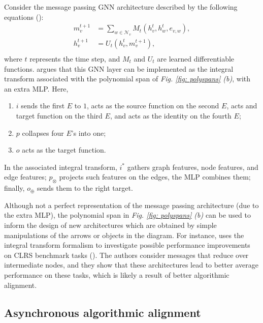 \documentclass[11pt,a4paper,openright,twoside]{report}
\theoremstyle{plain}
\theoremstyle{definition}
\begin{document}
Consider the message passing GNN architecture described by the following equations (\cite{pmlr-v70-gilmer17a}):
\begin{align*}
  m_v^{t+1} &= \sum_{w \in \mathcal{N}_v}M_t(h_v^t,h_w^t,e_{v,w}),\\
  h_v^{t+1} &= U_t(h_v^t,m_v^{t+1}),\\
\end{align*}
where $t$ represents the time step, and $M_t$ and $U_t$ are learned differentiable functions.\cite{dudzik2022graph} argues that this GNN layer can be implemented as the integral transform associated with the polynomial span of \textit{Fig. \ref{fig: polyspans} (b)}, with an extra MLP. Here,
\begin{enumerate}
  \item $i$ sends the first $E$ to $1$,  acts as the source function on the second $E$, acts  and target function on the third $E$, and acts as the identity on the fourth $E$;
  \item $p$ collapses four $E$'s into one;
  \item $o$ acts as the target function.
\end{enumerate}
In the associated integral transform, $i^*$ gathers graph features, node features, and edge features; $p_{\otimes}$ projects such features on the edges, the MLP combines them; finally, $o_{\oplus}$ sends them to the right target.

Although not a perfect representation of the message passing architecture (due to the extra MLP), the polynomial span in \textit{Fig. \ref{fig: polyspans} (b)} can be used to inform the design of new architectures which are obtained by simple manipulations of the arrows or objects in the diagram. For instance, \cite{dudzik2022graph} uses the integral transform formalism to investigate possible performance improvements on CLRS benchmark tasks (\cite{velivckovic2022clrs}). The authors consider messages that reduce over intermediate nodes, and they show that these architectures lead to better average performance on these tasks, which is likely a result of better algorithmic alignment.


\subsection{Asynchronous algorithmic alignment}
\end{document}
